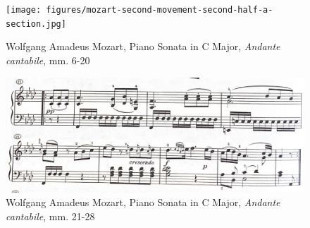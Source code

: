 \begin{figure}
	\centering
	\texttt{[image: figures/mozart-second-movement-second-half-a-section.jpg]}
	\caption{Wolfgang Amadeus Mozart, Piano Sonata in C Major, \textit{Andante cantabile}, mm. 6-20}
	\label{fig:mozart-second-movement-second-half-a-section}
\end{figure}

\begin{figure}
	\centering
	\includegraphics[width=\textwidth]{figures/mozart-second-movement-b-section-eight-bar-sentence.jpg}
	\caption{Wolfgang Amadeus Mozart, Piano Sonata in C Major, \textit{Andante cantabile}, mm. 21-28}
	\label{fig:mozart-second-movement-b-section-eight-bar-sentence}
\end{figure}

